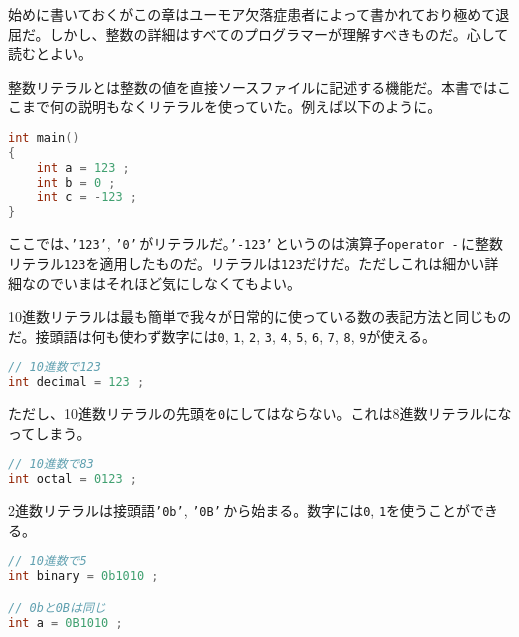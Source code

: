 
始めに書いておくがこの章はユーモア欠落症患者によって書かれており極めて退屈だ。しかし、整数の詳細はすべてのプログラマーが理解すべきものだ。心して読むとよい。


整数リテラルとは整数の値を直接ソースファイルに記述する機能だ。本書ではここまで何の説明もなくリテラルを使っていた。例えば以下のように。

\begin{lstlisting}[language={C++}]
int main()
{
    int a = 123 ;
    int b = 0 ;
    int c = -123 ;
}
\end{lstlisting}

ここでは、\texttt{'123'}, \texttt{'0'}\,がリテラルだ。\texttt{'-123'}\,というのは演算子\texttt{operator -}\,に整数リテラル\texttt{123}を適用したものだ。リテラルは\texttt{123}だけだ。ただしこれは細かい詳細なのでいまはそれほど気にしなくてもよい。


10進数リテラルは最も簡単で我々が日常的に使っている数の表記方法と同じものだ。接頭語は何も使わず数字には\texttt{0}, \texttt{1}, \texttt{2}, \texttt{3}, \texttt{4}, \texttt{5}, \texttt{6}, \texttt{7}, \texttt{8}, \texttt{9}が使える。

\ifTombow\pagebreak\fi
\begin{lstlisting}[language={C++}]
// 10進数で123
int decimal = 123 ;
\end{lstlisting}

ただし、10進数リテラルの先頭を\texttt{0}にしてはならない。これは8進数リテラルになってしまう。

\begin{lstlisting}[language={C++}]
// 10進数で83
int octal = 0123 ;
\end{lstlisting}


2進数リテラルは接頭語\texttt{'0b'}, \texttt{'0B'}\,から始まる。数字には\texttt{0}, \texttt{1}を使うことができる。

\begin{lstlisting}[language={C++}]
// 10進数で5
int binary = 0b1010 ;

// 0bと0Bは同じ
int a = 0B1010 ;
\end{lstlisting}


